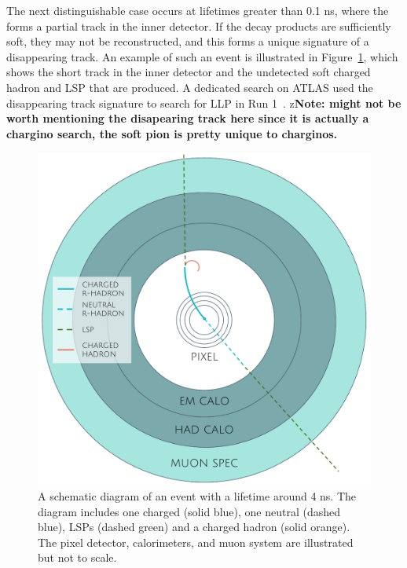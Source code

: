 The next distinguishable case occurs at lifetimes greater than 0.1 ns, where the \rhadron forms a partial track in the inner detector.
If the decay products are sufficiently soft, they may not be reconstructed, and this forms a unique signature of a disappearing track.
An example of such an event is illustrated in Figure~\ref{fig:rhadron_disappear}, which shows the short track in the inner detector and the undetected soft charged hadron and \ac{LSP} that are produced.
A dedicated search on \ac{ATLAS} used the disappearing track signature to search for \ac{LLP} in Run 1~\cite{SUSY-2013-01}.
z\textbf{Note: might not be worth mentioning the disapearing track here since it is actually a chargino search, the soft pion is pretty unique to charginos.}

\begin{figure}[h!]
\centering
\includegraphics[width=\halffig]{figures/rhadron_disappear.pdf}
\caption{A schematic diagram of an \rhadron event with a lifetime around 4 ns. The diagram includes one charged \rhadron (solid blue), one neutral \rhadron (dashed blue), \acp{LSP} (dashed green) and a charged hadron (solid orange). The pixel detector, calorimeters, and muon system are illustrated but not to scale.}
\label{fig:rhadron_disappear}
\end{figure}

